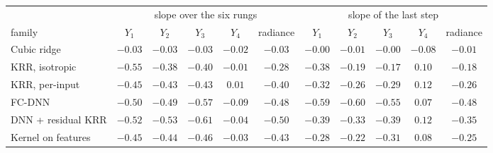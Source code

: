 \begin{tabular}{lccccc|ccccc}
\toprule
 & \multicolumn{5}{c|}{slope over the six rungs} & \multicolumn{5}{c}{slope of the last step} \\
family & $Y_1$ & $Y_2$ & $Y_3$ & $Y_4$ & radiance & $Y_1$ & $Y_2$ & $Y_3$ & $Y_4$ & radiance \\
\midrule
Cubic ridge & $-0.03$ & $-0.03$ & $-0.03$ & $-0.02$ & $-0.03$ & $-0.00$ & $-0.01$ & $-0.00$ & $-0.08$ & $-0.01$ \\
KRR, isotropic & $-0.55$ & $-0.38$ & $-0.40$ & $-0.01$ & $-0.28$ & $-0.38$ & $-0.19$ & $-0.17$ & $0.10$ & $-0.18$ \\
KRR, per-input & $-0.45$ & $-0.43$ & $-0.43$ & $0.01$ & $-0.40$ & $-0.32$ & $-0.26$ & $-0.29$ & $0.12$ & $-0.26$ \\
FC-DNN & $-0.50$ & $-0.49$ & $-0.57$ & $-0.09$ & $-0.48$ & $-0.59$ & $-0.60$ & $-0.55$ & $0.07$ & $-0.48$ \\
DNN + residual KRR & $-0.52$ & $-0.53$ & $-0.61$ & $-0.04$ & $-0.50$ & $-0.39$ & $-0.33$ & $-0.39$ & $0.12$ & $-0.35$ \\
Kernel on features & $-0.45$ & $-0.44$ & $-0.46$ & $-0.03$ & $-0.43$ & $-0.28$ & $-0.22$ & $-0.31$ & $0.08$ & $-0.25$ \\
\bottomrule
\end{tabular}

